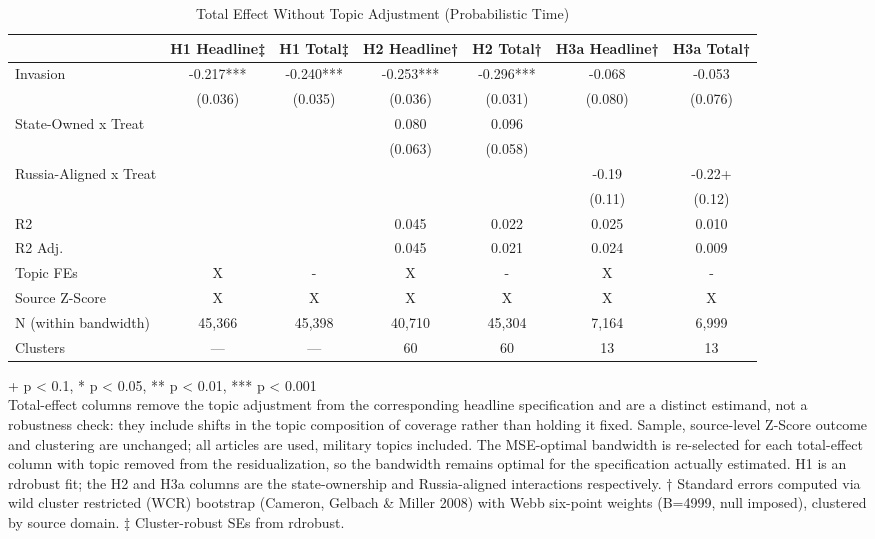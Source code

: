 \begin{table}[t]
\caption{Total Effect Without Topic Adjustment (Probabilistic Time)} 
\fontsize{12.0pt}{14.0pt}\selectfont
\begin{tabular*}{\linewidth}{@{\extracolsep{\fill}}lcccccc}
\toprule
  & H1 Headline‡ & H1 Total‡ & H2 Headline† & H2 Total† & H3a Headline† & H3a Total† \\ 
\midrule\addlinespace[2.5pt]
Invasion & -0.217*** & -0.240*** & -0.253*** & -0.296*** & -0.068 & -0.053 \\ 
 & (0.036) & (0.035) & (0.036) & (0.031) & (0.080) & (0.076) \\ 
State-Owned x Treat &  &  & 0.080 & 0.096 &  &  \\ 
 &  &  & (0.063) & (0.058) &  &  \\ 
Russia-Aligned x Treat &  &  &  &  & -0.19 & -0.22+ \\ 
{} & {} & {} & {} & {} & {(0.11)} & {(0.12)} \\ 
R2 &  &  & 0.045 & 0.022 & 0.025 & 0.010 \\ 
R2 Adj. &  &  & 0.045 & 0.021 & 0.024 & 0.009 \\ 
Topic FEs & X & - & X & - & X & - \\ 
Source Z-Score & X & X & X & X & X & X \\ 
N (within bandwidth) & 45,366 & 45,398 & 40,710 & 45,304 & 7,164 & 6,999 \\ 
Clusters & — & — & 60 & 60 & 13 & 13 \\ 
\bottomrule
\end{tabular*}
\begin{minipage}{\linewidth}
\vspace{.05em}
+ p < 0.1, * p < 0.05, ** p < 0.01, *** p < 0.001\\
Total-effect columns remove the topic adjustment from the corresponding headline
specification and are a distinct estimand, not a robustness check: they include
shifts in the topic composition of coverage rather than holding it fixed.
Sample, source-level Z-Score outcome and clustering are unchanged; all articles
are used, military topics included. The MSE-optimal bandwidth is re-selected
for each total-effect column with topic removed from the residualization, so
the bandwidth remains optimal for the specification actually estimated. H1 is an
rdrobust fit; the H2 and H3a columns are the state-ownership and Russia-aligned
interactions respectively. † Standard errors computed via wild cluster
restricted (WCR) bootstrap (Cameron, Gelbach \& Miller 2008) with Webb six-point
weights (B=4999, null imposed), clustered by source domain. ‡ Cluster-robust SEs
from rdrobust.\\
\end{minipage}
\end{table}

